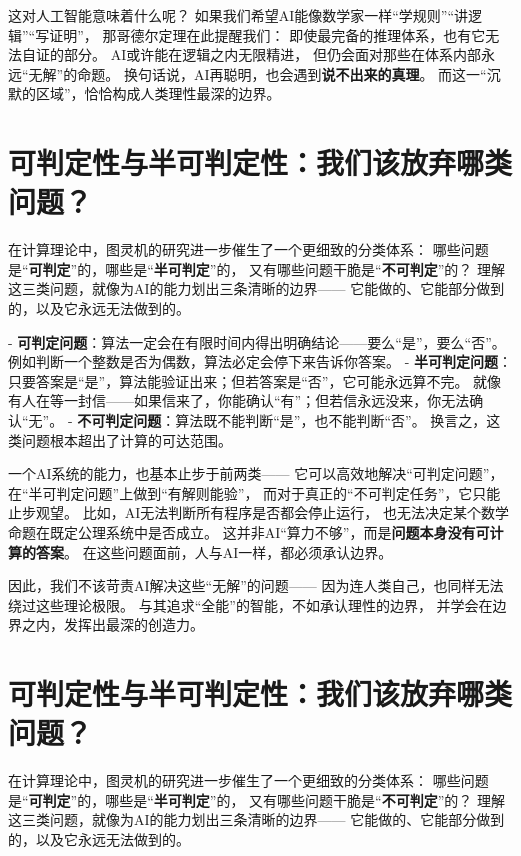 这对人工智能意味着什么呢？  
如果我们希望AI能像数学家一样“学规则”“讲逻辑”“写证明”，  
那哥德尔定理在此提醒我们：  
即使最完备的推理体系，也有它无法自证的部分。  
AI或许能在逻辑之内无限精进，  
但仍会面对那些在体系内部永远“无解”的命题。  
换句话说，AI再聪明，也会遇到\textbf{说不出来的真理}。  
而这一“沉默的区域”，恰恰构成人类理性最深的边界。

\section*{可判定性与半可判定性：我们该放弃哪类问题？}

在计算理论中，图灵机的研究进一步催生了一个更细致的分类体系：  
哪些问题是“\textbf{可判定}”的，哪些是“\textbf{半可判定}”的，  
又有哪些问题干脆是“\textbf{不可判定}”的？  
理解这三类问题，就像为AI的能力划出三条清晰的边界——  
它能做的、它能部分做到的，以及它永远无法做到的。

- \textbf{可判定问题}：算法一定会在有限时间内得出明确结论——要么“是”，要么“否”。  
  例如判断一个整数是否为偶数，算法必定会停下来告诉你答案。  
- \textbf{半可判定问题}：只要答案是“是”，算法能验证出来；但若答案是“否”，它可能永远算不完。  
  就像有人在等一封信——如果信来了，你能确认“有”；但若信永远没来，你无法确认“无”。  
- \textbf{不可判定问题}：算法既不能判断“是”，也不能判断“否”。  
  换言之，这类问题根本超出了计算的可达范围。

一个AI系统的能力，也基本止步于前两类——  
它可以高效地解决“可判定问题”，  
在“半可判定问题”上做到“有解则能验”，  
而对于真正的“不可判定任务”，它只能止步观望。  
比如，AI无法判断所有程序是否都会停止运行，  
也无法决定某个数学命题在既定公理系统中是否成立。  
这并非AI“算力不够”，而是\textbf{问题本身没有可计算的答案}。  
在这些问题面前，人与AI一样，都必须承认边界。

因此，我们不该苛责AI解决这些“无解”的问题——  
因为连人类自己，也同样无法绕过这些理论极限。  
与其追求“全能”的智能，不如承认理性的边界，  
并学会在边界之内，发挥出最深的创造力。

\section*{可判定性与半可判定性：我们该放弃哪类问题？}

在计算理论中，图灵机的研究进一步催生了一个更细致的分类体系：  
哪些问题是“\textbf{可判定}”的，哪些是“\textbf{半可判定}”的，  
又有哪些问题干脆是“\textbf{不可判定}”的？  
理解这三类问题，就像为AI的能力划出三条清晰的边界——  
它能做的、它能部分做到的，以及它永远无法做到的。

